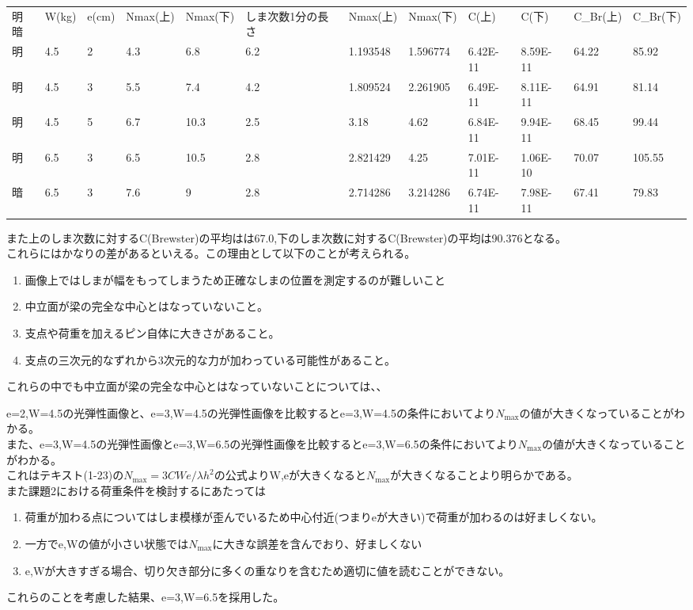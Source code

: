 \documentclass[uplatex,dvipdfmx,titlepage]{jsarticle}
\begin{document}
\begin{table}[]
\begin{tabular}{llllllllllll}
明暗 & W(kg) & e(cm) & Nmax(上) & Nmax(下) & しま次数1分の長さ & Nmax(上)  & Nmax(下)  & C(上)     & C(下)     & C\_Br(上) & C\_Br(下) \\
明  & 4.5   & 2     & 4.3     & 6.8     & 6.2       & 1.193548 & 1.596774 & 6.42E-11 & 8.59E-11 & 64.22    & 85.92    \\
明  & 4.5   & 3     & 5.5     & 7.4     & 4.2       & 1.809524 & 2.261905 & 6.49E-11 & 8.11E-11 & 64.91    & 81.14    \\
明  & 4.5   & 5     & 6.7     & 10.3    & 2.5       & 3.18     & 4.62     & 6.84E-11 & 9.94E-11 & 68.45    & 99.44    \\
明  & 6.5   & 3     & 6.5     & 10.5    & 2.8       & 2.821429 & 4.25     & 7.01E-11 & 1.06E-10 & 70.07    & 105.55   \\
暗  & 6.5   & 3     & 7.6     & 9       & 2.8       & 2.714286 & 3.214286 & 6.74E-11 & 7.98E-11 & 67.41    & 79.83   
\end{tabular}
\end{table}
また上のしま次数に対するC(Brewster)の平均はは67.0,下のしま次数に対するC(Brewster)の平均は90.376となる。\\
これらにはかなりの差があるといえる。この理由として以下のことが考えられる。\\
\begin{enumerate}[label=\arabic*.]
    \item 画像上ではしまが幅をもってしまうため正確なしまの位置を測定するのが難しいこと
    \item 中立面が梁の完全な中心とはなっていないこと。
    \item 支点や荷重を加えるピン自体に大きさがあること。
    \item 支点の三次元的なずれから3次元的な力が加わっている可能性があること。
\end{enumerate}
これらの中でも中立面が梁の完全な中心とはなっていないことについては、、




e=2,W=4.5の光弾性画像と、e=3,W=4.5の光弾性画像を比較するとe=3,W=4.5の条件においてより$N_{\text{max}}$の値が大きくなっていることがわかる。\\
また、e=3,W=4.5の光弾性画像とe=3,W=6.5の光弾性画像を比較するとe=3,W=6.5の条件においてより$N_{\text{max}}$の値が大きくなっていることがわかる。\\
これはテキスト(1-23)の$N_{\text{max}}=3CWe/λh^2$の公式よりW,eが大きくなると$N_{\text{max}} $が大きくなることより明らかである。\\
また課題2における荷重条件を検討するにあたっては
\begin{enumerate}[label=\arabic*.]
    \item 荷重が加わる点についてはしま模様が歪んでいるため中心付近(つまりeが大きい)で荷重が加わるのは好ましくない。
    \item 一方でe,Wの値が小さい状態では$N_{\text{max}}$に大きな誤差を含んでおり、好ましくない
    \item e,Wが大きすぎる場合、切り欠き部分に多くの重なりを含むため適切に値を読むことができない。
\end{enumerate}
これらのことを考慮した結果、e=3,W=6.5を採用した。
\end{document}
